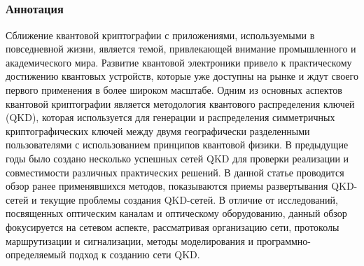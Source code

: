 \subsection{\trnas}

\subsubsection*{Аннотация}
Сближение квантовой криптографии с приложениями, используемыми в повседневной жизни, является темой, привлекающей внимание промышленного и академического мира. Развитие квантовой электроники привело к практическому достижению квантовых устройств, которые уже доступны на рынке и ждут своего первого применения в более широком масштабе. Одним из основных аспектов квантовой криптографии является методология квантового распределения ключей (QKD), которая используется для генерации и распределения симметричных криптографических ключей между двумя географически разделенными пользователями с использованием принципов квантовой физики. В предыдущие годы было создано несколько успешных сетей QKD для проверки реализации и совместимости различных практических решений. В данной статье проводится обзор ранее применявшихся методов, показываются приемы развертывания QKD-сетей и текущие проблемы создания QKD-сетей. В отличие от исследований, посвященных оптическим каналам и оптическому оборудованию, данный обзор фокусируется на сетевом аспекте, рассматривая организацию сети, протоколы маршрутизации и сигнализации, методы моделирования и программно-определяемый подход к созданию сети QKD.


